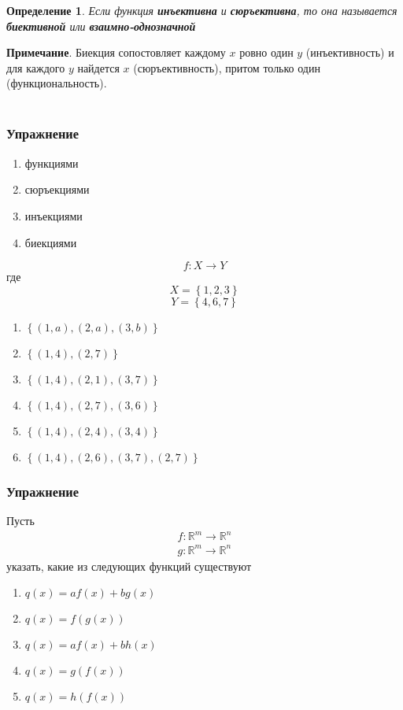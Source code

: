 \documentclass[]{article}
\newtheorem{dfn}{Определение}
\begin{document}
	\begin{dfn}
		Если функция \textbf{инъективна} и \textbf{сюръективна}, то она называется \textbf{биективной} или \textbf{взаимно-однозначной}
	\end{dfn}
	
	\textbf{Примечание}. Биекция сопостовляет каждому $x$ ровно один $y$ (инъективность) и для каждого $y$ найдется $x$ (сюръективность), притом только один (функциональность).
	\\
	\\
	\subsubsection{Упражнение}
	\begin{enumerate}
		\item функциями
		\item сюръекциями
		\item инъекциями
		\item биекциями
	\end{enumerate} $$f:X\rightarrow Y$$ где $$X=\left\{1,2,3\right\}$$  $$Y=\left\{4,6,7\right\}$$
	
	\begin{enumerate}
		\item $\left\{(1,a),(2,a),(3,b)\right\}$ 
		\item $\left\{(1,4),(2,7)\right\}$ 
		\item $\left\{(1,4),(2,1),(3,7)\right\}$ 
		\item $\left\{(1,4),(2,7),(3,6)\right\}$
		\item $\left\{(1,4),(2,4),(3,4)\right\}$  
		\item $\left\{(1,4),(2,6),(3,7),(2,7)\right\}$  
	\end{enumerate}
	
	\subsubsection{Упражнение}
	Пусть \begin{gather*}
		f:\mathbb{R}^m\rightarrow\mathbb{R}^n
		\\
		g:\mathbb{R}^m\rightarrow\mathbb{R}^n
	\end{gather*}
	указать, какие из следующих функций существуют
	
	\begin{enumerate}
		\item $q(x)=af(x)+bg(x)$
		\item $q(x)=f(g(x))$
		\item $q(x)=af(x)+bh(x)$
		\item $q(x)=g(f(x))$
		\item $q(x)=h(f(x))$
	\end{enumerate}
	
\end{document}
